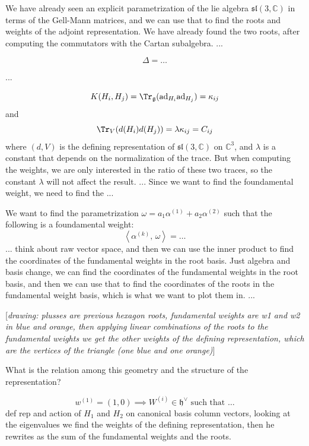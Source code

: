 \begin{example}[\(\mathfrak{g} = \mathfrak{su}(3)_\mathbb{C} = \mathfrak{sl}(3, \mathbb{C})\)]
    We have already seen an explicit parametrization of the lie algebra \(\mathfrak{sl}(3, \mathbb{C})\) in terms of the Gell-Mann matrices, and we can use that to find the roots and weights of the adjoint representation. We have already found the two roots, after computing the commutators with the Cartan subalgebra.
    ...

    \[
        \Delta = \dots
    \]

    ...

    \[
        K(H_i,H_j) = \Tr_{\mathfrak{g}}(\mathrm{ad}_{H_i} \mathrm{ad}_{H_j}) = \kappa_{ij}
    \]
    and
    \[
        \Tr_V (d(H_i) d(H_j)) = \lambda \kappa_{ij} = C_{ij}
    \]
    where \((d,V)\) is the defining representation of \(\mathfrak{sl}(3, \mathbb{C})\) on \(\mathbb{C}^3\), and \(\lambda\) is a constant that depends on the normalization of the trace. But when computing the weights, we are only interested in the ratio of these two traces, so the constant \(\lambda\) will not affect the result.
    ...
    Since we want to find the foundamental weight, we need to find the ...

    We want to find the parametrization \(\omega = a_1 \alpha^{(1)} + a_2 \alpha^{(2)}\) such that the following is a foundamental weight:
    \[
        \left\langle \alpha^{(k)},\, \omega \right\rangle = \dots
    \]
    ...
    think about raw vector space, and then we can use the inner product to find the coordinates of the fundamental weights in the root basis. Just algebra and basis change, we can find the coordinates of the fundamental weights in the root basis, and then we can use that to find the coordinates of the roots in the fundamental weight basis, which is what we want to plot them in.
    ...

        [\textit{drawing: plusses are previous hexagon roots, fundamental weights are w1 and w2 in blue and orange, then applying linear combinations of the roots to the fundamental weights we get the other weights of the defining representation, which are the vertices of the triangle (one blue and one orange)}]

    What is the relation among this geometry and the structure of the representation?

    \[
        w^{(1)} = (1,0) \implies W^{(i)} \in \mathfrak{h}^\vee \text{ such that } \dots
    \]
    def rep and action of \(H_1\) and \(H_2\) on canonical basis column vectors, looking at the eigenvalues we find the weights of the defining representation, then he rewrites as the sum of the fundamental weights and the roots.


\end{example}
